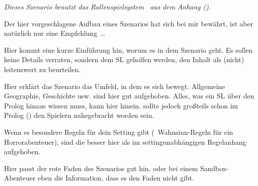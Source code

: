 
\begin{center}
\noindent\emph{Dieses Szenario benutzt das Rollenspielsystem \logonipajin~aus dem Anhang ().} 
\end{center}


\begin{multicols}{2}

\noindent
Der hier vorgeschlagene Aufbau eines Szenarios hat sich bei mir bewährt, ist aber natürlich nur eine Empfehlung~\ldots


Hier kommt eine kurze Einführung hin, worum es in dem Szenario geht. Es sollen keine Details verraten, sondern dem SL geholfen werden, den Inhalt als (nicht) leitenswert zu beurteilen.

\lipsum[1]


Hier erklärt das Szenario das Umfeld, in dem es sich bewegt. Allgemeine Geographie, Geschichte usw. sind hier gut aufgehoben. Alles, was ein SL über den Prolog hinaus wissen muss, kann hier hinein.  sollte jedoch großteils schon im Prolog () den Spielern nahegebracht worden sein. 

\lipsum[2-4]


Wenn es besondere Regeln für dein Setting gibt (\zB~Wahnsinn-Regeln für ein Horrorabenteuer), sind die besser hier als im settingunabhängigen Regelanhang aufgehoben.

\lipsum[18] 


Hier passt der rote Faden des Szenarios gut hin, oder bei einem Sandbox-Abenteuer eben die Information, dass es den Faden nicht gibt.

\lipsum[5-9]
 

\end{multicols}
